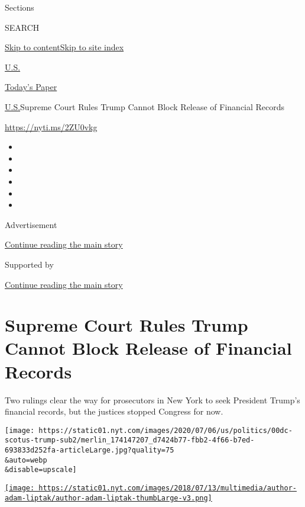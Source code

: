 Sections

SEARCH

\protect\hyperlink{site-content}{Skip to
content}\protect\hyperlink{site-index}{Skip to site index}

\href{https://www.nytimes.com/section/us}{U.S.}

\href{https://myaccount.nytimes.com/auth/login?response_type=cookie\&client_id=vi}{}

\href{https://www.nytimes.com/section/todayspaper}{Today's Paper}

\href{/section/us}{U.S.}\textbar{}Supreme Court Rules Trump Cannot Block
Release of Financial Records

\url{https://nyti.ms/2ZU0vkg}

\begin{itemize}
\item
\item
\item
\item
\item
\item
\end{itemize}

Advertisement

\protect\hyperlink{after-top}{Continue reading the main story}

Supported by

\protect\hyperlink{after-sponsor}{Continue reading the main story}

\hypertarget{supreme-court-rules-trump-cannot-block-release-of-financial-records}{%
\section{Supreme Court Rules Trump Cannot Block Release of Financial
Records}\label{supreme-court-rules-trump-cannot-block-release-of-financial-records}}

Two rulings clear the way for prosecutors in New York to seek President
Trump's financial records, but the justices stopped Congress for now.

\texttt{[image: https://static01.nyt.com/images/2020/07/06/us/politics/00dc-scotus-trump-sub2/merlin\_174147207\_d7424b77-fbb2-4f66-b7ed-693833d252fa-articleLarge.jpg?quality=75\\\&auto=webp\\\&disable=upscale]}

\href{https://www.nytimes.com/by/adam-liptak}{\texttt{[image: https://static01.nyt.com/images/2018/07/13/multimedia/author-adam-liptak/author-adam-liptak-thumbLarge-v3.png]}}

